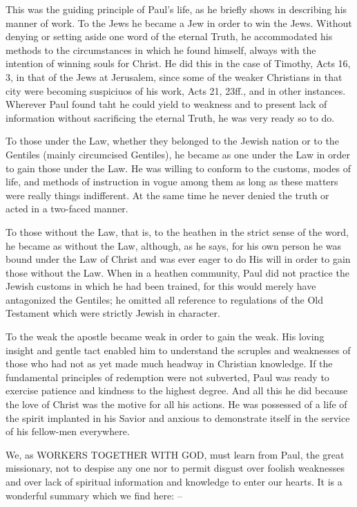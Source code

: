 \documentclass[
]{book}
\begin{document}
This was the guiding principle of Paul's life, as he briefly shows in describing his manner of work. To the Jews he became a Jew in order to win the Jews. Without denying or setting aside one word of the eternal Truth, he accommodated his methods to the circumstances in which he found himself, always with the intention of winning souls for Christ. He did this in the case of Timothy, Acts 16, 3, in that of the Jews at Jerusalem, since some of the weaker Christians in that city were becoming suspiciuos of his work, Acts 21, 23ff., and in other instances. Wherever Paul found taht he could yield to weakness and to present lack of information without sacrificing the eternal Truth, he was very ready so to do.

To those under the Law, whether they belonged to the Jewish nation or to the Gentiles (mainly circumcised Gentiles), he became as one under the Law in order to gain those under the Law. He was willing to conform to the customs, modes of life, and methods of instruction in vogue among them as long as these matters were really things indifferent. At the same time he never denied the truth or acted in a two-faced manner.

To those without the Law, that is, to the heathen in the strict sense of the word, he became as without the Law, although, as he says, for his own person he was bound under the Law of Christ and was ever eager to do His will in order to gain those without the Law. When in a heathen community, Paul did not practice the Jewish customs in which he had been trained, for this would merely have antagonized the Gentiles; he omitted all reference to regulations of the Old Testament which were strictly Jewish in character.

To the weak the apostle became weak in order to gain the weak. His loving insight and gentle tact enabled him to understand the scruples and weaknesses of those who had not as yet made much headway in Christian knowledge. If the fundamental principles of redemption were not subverted, Paul was ready to exercise patience and kindness to the highest degree. And all this he did because the love of Christ was the motive for all his actions. He was possessed of a life of the spirit implanted in his Savior and anxious to demonstrate itself in the service of his fellow-men everywhere.

We, as WORKERS TOGETHER WITH GOD, must learn from Paul, the great missionary, not to despise any one nor to permit disgust over foolish weaknesses and over lack of spiritual information and knowledge to enter our hearts. It is a wonderful summary which we find here: --
\end{document}
